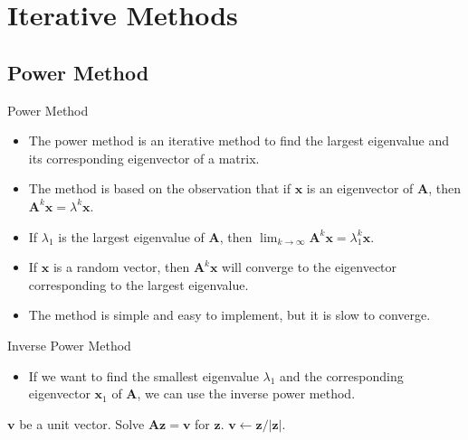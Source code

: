 \documentclass{beamer}
\begin{document}
\section{Iterative Methods}
\subsection[Power Method]{Power Method}
\begin{frame}{Power Method}
\begin{itemize}
\item The power method is an iterative method to find the largest eigenvalue and its corresponding eigenvector of a matrix.
\item The method is based on the observation that if $\mathbf{x}$ is an eigenvector of $\mathbf{A}$, then $\mathbf{A}^k\mathbf{x}=\lambda^k\mathbf{x}$.
\item If $\lambda_1$ is the largest eigenvalue of $\mathbf{A}$, then $\lim_{k\to \infty} \mathbf{A}^k\mathbf{x}=\lambda_1^k\mathbf{x}$.
\item If $\mathbf{x}$ is a random vector, then $\mathbf{A}^k\mathbf{x}$ will converge to the eigenvector corresponding to the largest eigenvalue.
\item The method is simple and easy to implement, but it is slow to converge.
\end{itemize}
\end{frame}
\begin{frame}[fragile]{Inverse Power Method}
    \begin{itemize}
        \item If we want to find the smallest eigenvalue $\lambda_1$ and the corresponding eigenvector $\mathbf{x}_1$
        of $\mathbf{A}$, we can use the inverse power method.
    \end{itemize}
    \begin{algorithm}[H]
        \caption{Inverse Power Method}
        \begin{algorithmic}
            \State $\mathbf{v}$ be a unit vector.
                \State Solve $\mathbf{A z}=\mathbf{v}$ for  $\mathbf{z}$.
                \State $\mathbf{v}\gets \mathbf{z} /|\mathbf{z}|$.
            \EndWhile
        \end{algorithmic}
    \end{algorithm}
\end{frame}
\end{document}
